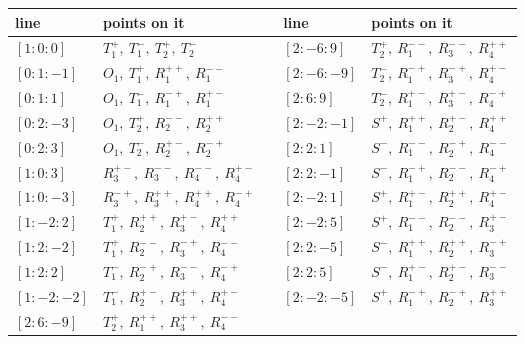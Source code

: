 \documentclass[11pt]{article}
\theoremstyle{plain}
\theoremstyle{definition}
\begin{document}
\begin{center}
\small
\begin{tabular}{@{}l@{\quad}l@{\qquad}c@{\qquad}l@{\quad}l@{}}
\toprule
line & points on it && line & points on it\\
\midrule
$[1:0:0]$ & $T_1^{+},\ T_1^{-},\ T_2^{+},\ T_2^{-}$ && $[2:-6:9]$ & $T_2^{+},\ R_1^{--},\ R_3^{--},\ R_4^{++}$\\
$[0:1:-1]$ & $O_1,\ T_1^{+},\ R_1^{++},\ R_1^{--}$ && $[2:-6:-9]$ & $T_2^{-},\ R_1^{-+},\ R_3^{-+},\ R_4^{+-}$\\
$[0:1:1]$ & $O_1,\ T_1^{-},\ R_1^{-+},\ R_1^{+-}$ && $[2:6:9]$ & $T_2^{-},\ R_1^{+-},\ R_3^{+-},\ R_4^{-+}$\\
$[0:2:-3]$ & $O_1,\ T_2^{+},\ R_2^{--},\ R_2^{++}$ && $[2:-2:-1]$ & $S^{+},\ R_1^{++},\ R_2^{+-},\ R_4^{++}$\\
$[0:2:3]$ & $O_1,\ T_2^{-},\ R_2^{+-},\ R_2^{-+}$ && $[2:2:1]$ & $S^{-},\ R_1^{--},\ R_2^{-+},\ R_4^{--}$\\
$[1:0:3]$ & $R_3^{+-},\ R_3^{--},\ R_4^{--},\ R_4^{+-}$ && $[2:2:-1]$ & $S^{-},\ R_1^{-+},\ R_2^{--},\ R_4^{-+}$\\
$[1:0:-3]$ & $R_3^{-+},\ R_3^{++},\ R_4^{++},\ R_4^{-+}$ && $[2:-2:1]$ & $S^{+},\ R_1^{+-},\ R_2^{++},\ R_4^{+-}$\\
$[1:-2:2]$ & $T_1^{+},\ R_2^{++},\ R_3^{+-},\ R_4^{++}$ && $[2:-2:5]$ & $S^{+},\ R_1^{--},\ R_2^{--},\ R_3^{+-}$\\
$[1:2:-2]$ & $T_1^{+},\ R_2^{--},\ R_3^{-+},\ R_4^{--}$ && $[2:2:-5]$ & $S^{-},\ R_1^{++},\ R_2^{++},\ R_3^{-+}$\\
$[1:2:2]$ & $T_1^{-},\ R_2^{-+},\ R_3^{--},\ R_4^{-+}$ && $[2:2:5]$ & $S^{-},\ R_1^{+-},\ R_2^{+-},\ R_3^{--}$\\
$[1:-2:-2]$ & $T_1^{-},\ R_2^{+-},\ R_3^{++},\ R_4^{+-}$ && $[2:-2:-5]$ & $S^{+},\ R_1^{-+},\ R_2^{-+},\ R_3^{++}$\\
$[2:6:-9]$ & $T_2^{+},\ R_1^{++},\ R_3^{++},\ R_4^{--}$ && &\\
\bottomrule
\end{tabular}
\end{center}
\end{document}
